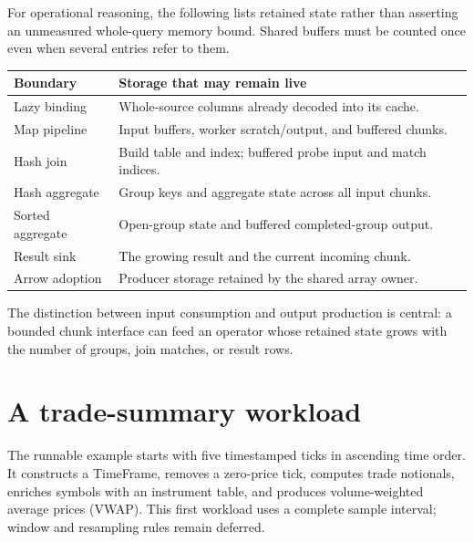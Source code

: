 For operational reasoning, the following lists retained state rather than
asserting an unmeasured whole-query memory bound. Shared buffers must be
counted once even when several entries refer to them.
\begin{center}
\begin{tabularx}{\linewidth}{@{}lX@{}}
\toprule
Boundary & Storage that may remain live\\
\midrule
Lazy binding & Whole-source columns already decoded into its cache.\\
Map pipeline & Input buffers, worker scratch/output, and buffered chunks.\\
Hash join & Build table and index; buffered probe input and match indices.\\
Hash aggregate & Group keys and aggregate state across all input chunks.\\
Sorted aggregate & Open-group state and buffered completed-group output.\\
Result sink & The growing result and the current incoming chunk.\\
Arrow adoption & Producer storage retained by the shared array owner.\\
\bottomrule
\end{tabularx}
\end{center}
The distinction between input consumption and output production is central:
a bounded chunk interface can feed an operator whose retained state grows
with the number of groups, join matches, or result rows.

\section{A trade-summary workload}
\label{sec:trade-workload}
The runnable example  starts with five
timestamped ticks in ascending time order. It constructs a TimeFrame, removes
a zero-price tick, computes trade notionals, enriches symbols with an instrument
table, and produces volume-weighted average prices (VWAP). This first workload
uses a complete sample interval; window and resampling rules remain deferred.




